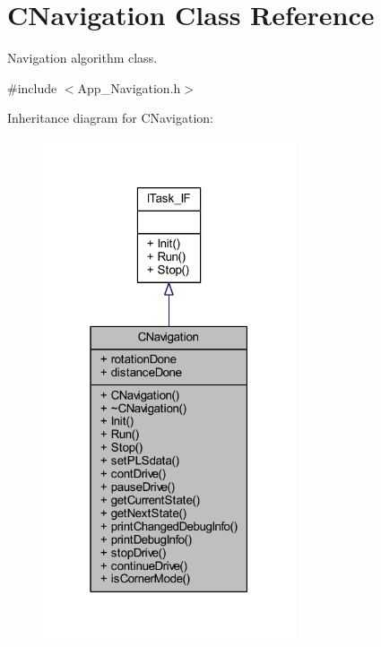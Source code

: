 \hypertarget{class_c_navigation}{}\section{C\+Navigation Class Reference}
\label{class_c_navigation}


Navigation algorithm class.  




{\ttfamily \#include $<$App\+\_\+\+Navigation.\+h$>$}



Inheritance diagram for C\+Navigation\+:\nopagebreak
\begin{figure}[H]
\begin{center}
\leavevmode
\includegraphics[width=211pt]{class_c_navigation__inherit__graph}
\end{center}
\end{figure}


